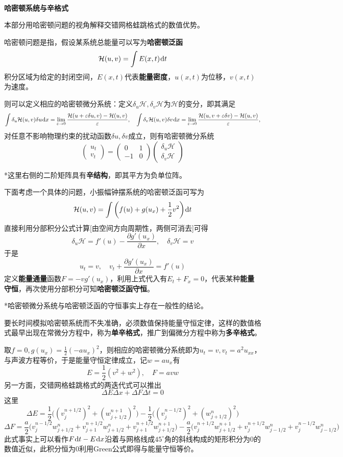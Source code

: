 \documentclass[a4paper,UTF8,fontset=windows]{ctexart}
\newcommand*{\dr}{\hspace{0.07em}\mathrm{d}}
\begin{document}
\

\textbf{哈密顿系统与辛格式}

本部分用哈密顿问题的视角解释交错网格蛙跳格式的数值优势。

哈密顿问题是指，假设某系统总能量可以写为\textbf{哈密顿泛函}
$$\mathcal{H}(u,v)=\int E(x,t)\dr t$$
积分区域为给定的封闭空间，$E(x,t)$代表\textbf{能量密度}，$u(x,t)$为位移，$v(x,t)$为速度。

则可以定义相应的哈密顿微分系统：定义$\delta_u\mathcal{H},\delta_v\mathcal{H}$为$\mathcal{H}$的变分，即其满足
$$\int\delta_u\mathcal{H}(u,v)\delta u\dr x=\lim_{\varepsilon\to0}\frac{\mathcal{H}(u+\varepsilon\delta u,v)-\mathcal{H}(u,v)}{\varepsilon},\quad\int\delta_v\mathcal{H}(u,v)\delta v\dr x=\lim_{\varepsilon\to0}\frac{\mathcal{H}(u,v+\varepsilon\delta v)-\mathcal{H}(u,v)}{\varepsilon},$$
对任意不影响物理约束的扰动函数$\delta u,\delta v$成立，则有哈密顿微分系统
$$\begin{pmatrix}u_t\\v_t\end{pmatrix}=\begin{pmatrix}0&1\\-1&0\end{pmatrix}\begin{pmatrix}\delta_u\mathcal{H}\\\delta_v\mathcal{H}\end{pmatrix}$$

*这里右侧的二阶矩阵具有\textbf{辛结构}，即其平方为负单位阵。

下面考虑一个具体的问题，小振幅钟摆系统的哈密顿泛函可写为
$$\mathcal{H}(u,v)=\int\bigg(f(u)+g(u_x)+\frac{1}{2}v^2\bigg)\dr t$$
直接利用分部积分公式计算[由空间方向周期性，两侧可消去]可得
$$\delta_u\mathcal{H}=f'(u)-\frac{\partial g'(u_x)}{\partial x},\quad\delta_v\mathcal{H}=v$$
于是
$$u_t=v,\quad v_t+\frac{\partial g'(u_x)}{\partial x}=f'(u)$$
定义\textbf{能量通量}函数$F=-vg'(u_x)$，利用上式代入有$E_t+F_x=0$，代表某种\textbf{能量守恒}，再次使用分部积分可知\textbf{哈密顿泛函守恒}。

*哈密顿微分系统与哈密顿泛函的守恒事实上存在一般性的结论。

要长时间模拟哈密顿系统而不失准确，必须数值保持能量守恒定律，这样的数值格式最早出现在常微分方程中，称为\textbf{单辛格式}，推广到偏微分方程中称为\textbf{多辛格式}。

取$f=0,g(u_x)=\frac{1}{2}(-au_x)^2$，则相应的哈密顿微分系统即为$u_t=v,v_t=a^2u_{xx}$，与声波方程等价，于是能量守恒定律成立，记$w=au_x$有
$$E=\frac{1}{2}(v^2+w^2),\quad F=avw$$
另一方面，交错网格蛙跳格式的两迭代式可以推出
$$\Delta E\Delta x+\Delta F\Delta t=0$$
这里
$$\Delta E=\frac{1}{2}\big((v_j^{n+1/2})^2+(w_{j+1/2}^{n+1})^2\big)-\frac{1}{2}\big((v_j^{n-1/2})^2+(w_{j+1/2}^n)^2\big)$$
$$\Delta F=\frac{a}{2}\big(v_j^{n-1/2}w_{j+1/2}^n+v_{j+1}^{n+1/2}w_{j+1/2}^n+v_{j+1}^{n+1/2}w_{j+1/2}^{n+1}\big)-\frac{a}{2}\big(v_j^{n+1/2}w_{j+1/2}^{n+1}+v_j^{n+1/2}w_{j-1/2}^n+v_j^{n-1/2}w_{j-1/2}^n\big)$$
此式事实上可以看作$F\dr t-E\dr x$沿着与网格线成$45^\circ$角的斜线构成的矩形积分为0的数值近似，此积分恒为0利用Green公式即得与能量守恒等价。
\end{document}
